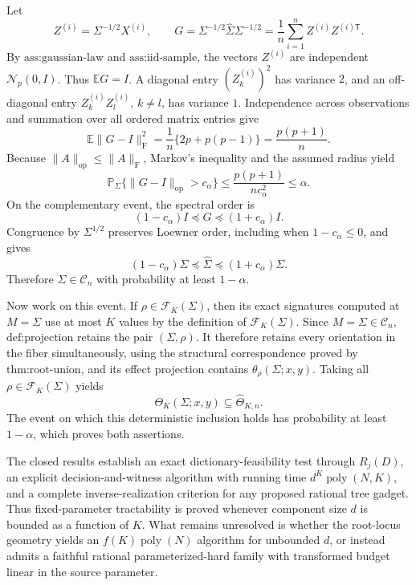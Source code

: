 Let
\[
 Z^{(i)}=\Sigma^{-1/2}X^{(i)},
 \qquad
 G=\Sigma^{-1/2}\widehat\Sigma\Sigma^{-1/2}
 =\frac1n\sum_{i=1}^{n}Z^{(i)}Z^{(i)\mathsf T}.
\]
By \(\text{ass:gaussian-law}\) and \(\text{ass:iid-sample}\), the vectors \(Z^{(i)}\) are independent \(\mathcal N_p(0,I)\).  Thus \(\mathbb E G=I\).  A diagonal entry \((Z_k^{(i)})^2\) has variance \(2\), and an off-diagonal entry \(Z_k^{(i)}Z_l^{(i)}\), \(k\ne l\), has variance \(1\).  Independence across observations and summation over all ordered matrix entries give
\[
 \mathbb E\|G-I\|_{\mathrm F}^{2}
 =\frac1n\{2p+p(p-1)\}
 =\frac{p(p+1)}{n}.
\]
Because \(\|A\|_{\mathrm{op}}\le\|A\|_{\mathrm F}\), Markov's inequality and the assumed radius yield
\[
 \mathbb P_\Sigma\{\|G-I\|_{\mathrm{op}}>c_\alpha\}
 \le\frac{p(p+1)}{nc_\alpha^2}\le\alpha.
\]
On the complementary event, the spectral order is
\[
 (1-c_\alpha)I\preceq G\preceq(1+c_\alpha)I.
\]
Congruence by \(\Sigma^{1/2}\) preserves Loewner order, including when \(1-c_\alpha\le0\), and gives
\[
 (1-c_\alpha)\Sigma\preceq\widehat\Sigma
 \preceq(1+c_\alpha)\Sigma.
\]
Therefore \(\Sigma\in\mathcal C_n\) with probability at least \(1-\alpha\).

Now work on this event.  If \(\rho\in\mathcal F_K(\Sigma)\), then its exact signatures computed at \(M=\Sigma\) use at most \(K\) values by the definition of \(\mathcal F_K(\Sigma)\).  Since \(M=\Sigma\in\mathcal C_n\), \(\text{def:projection}\) retains the pair \((\Sigma,\rho)\).  It therefore retains every orientation in the fiber simultaneously, using the structural correspondence proved by \(\text{thm:root-union}\), and its effect projection contains \(\theta_\rho(\Sigma;x,y)\).  Taking all \(\rho\in\mathcal F_K(\Sigma)\) yields
\[
 \Theta_K(\Sigma;x,y)\subseteq\widehat\Theta_{K,n}.
\]
The event on which this deterministic inclusion holds has probability at least \(1-\alpha\), which proves both assertions.

The closed results establish an exact dictionary-feasibility test through \(R_j(D)\), an explicit decision-and-witness algorithm with running time \(d^K\operatorname{poly}(N,K)\), and a complete inverse-realization criterion for any proposed rational tree gadget.  Thus fixed-parameter tractability is proved whenever component size \(d\) is bounded as a function of \(K\).  What remains unresolved is whether the root-locus geometry yields an \(f(K)\operatorname{poly}(N)\) algorithm for unbounded \(d\), or instead admits a faithful rational parameterized-hard family with transformed budget linear in the source parameter.

